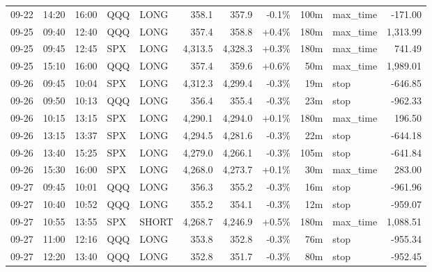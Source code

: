 \documentclass[11pt,a4paper,twoside]{article}
\begin{document}
\begin{center}
\begin{longtable}{>{\color{txtmain}}l l l l l r r r r >{\color{txtmain}}l r}
09-22 & 14:20 & 16:00 & QQQ & LONG & 358.1 & 357.9 & \textcolor{lossred}{-0.1\%} & 100m & max\_time & \textcolor{lossred}{-171.00} \\
09-25 & 09:40 & 12:40 & QQQ & LONG & 357.4 & 358.8 & \textcolor{wingreen}{+0.4\%} & 180m & max\_time & \textcolor{wingreen}{1,313.99} \\
09-25 & 09:45 & 12:45 & SPX & LONG & 4,313.5 & 4,328.3 & \textcolor{wingreen}{+0.3\%} & 180m & max\_time & \textcolor{wingreen}{741.49} \\
09-25 & 15:10 & 16:00 & QQQ & LONG & 357.4 & 359.6 & \textcolor{wingreen}{+0.6\%} & 50m & max\_time & \textcolor{wingreen}{1,989.01} \\
09-26 & 09:45 & 10:04 & SPX & LONG & 4,312.3 & 4,299.4 & \textcolor{lossred}{-0.3\%} & 19m & stop & \textcolor{lossred}{-646.85} \\
09-26 & 09:50 & 10:13 & QQQ & LONG & 356.4 & 355.4 & \textcolor{lossred}{-0.3\%} & 23m & stop & \textcolor{lossred}{-962.33} \\
09-26 & 10:15 & 13:15 & SPX & LONG & 4,290.1 & 4,294.0 & \textcolor{wingreen}{+0.1\%} & 180m & max\_time & \textcolor{wingreen}{196.50} \\
09-26 & 13:15 & 13:37 & SPX & LONG & 4,294.5 & 4,281.6 & \textcolor{lossred}{-0.3\%} & 22m & stop & \textcolor{lossred}{-644.18} \\
09-26 & 13:40 & 15:25 & SPX & LONG & 4,279.0 & 4,266.1 & \textcolor{lossred}{-0.3\%} & 105m & stop & \textcolor{lossred}{-641.84} \\
09-26 & 15:30 & 16:00 & SPX & LONG & 4,268.0 & 4,273.7 & \textcolor{wingreen}{+0.1\%} & 30m & max\_time & \textcolor{wingreen}{283.00} \\
09-27 & 09:45 & 10:01 & QQQ & LONG & 356.3 & 355.2 & \textcolor{lossred}{-0.3\%} & 16m & stop & \textcolor{lossred}{-961.96} \\
09-27 & 10:40 & 10:52 & QQQ & LONG & 355.2 & 354.1 & \textcolor{lossred}{-0.3\%} & 12m & stop & \textcolor{lossred}{-959.07} \\
09-27 & 10:55 & 13:55 & SPX & SHORT & 4,268.7 & 4,246.9 & \textcolor{wingreen}{+0.5\%} & 180m & max\_time & \textcolor{wingreen}{1,088.51} \\
09-27 & 11:00 & 12:16 & QQQ & LONG & 353.8 & 352.8 & \textcolor{lossred}{-0.3\%} & 76m & stop & \textcolor{lossred}{-955.34} \\
09-27 & 12:20 & 13:40 & QQQ & LONG & 352.8 & 351.7 & \textcolor{lossred}{-0.3\%} & 80m & stop & \textcolor{lossred}{-952.45} \\

\end{longtable}
\end{center}
\end{document}
